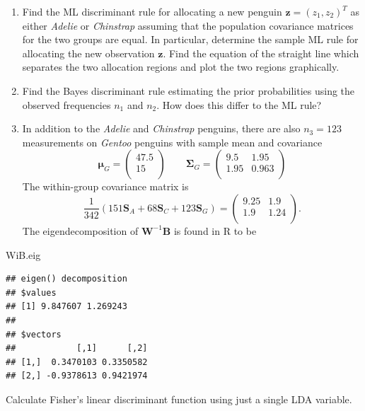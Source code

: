 \documentclass[
]{book}
\newenvironment{Shaded}{\begin{snugshade}}{\end{snugshade}}
\newcommand{\NormalTok}[1]{#1}
\theoremstyle{definition}
\theoremstyle{definition}
\theoremstyle{definition}
\theoremstyle{definition}
\theoremstyle{remark}
\begin{document}
\begin{enumerate}
\def\labelenumi{\roman{enumi}.}
\item
  Find the ML discriminant rule for allocating a new penguin \(\mathbf z=(z_1,z_2)^T\) as either \emph{Adelie} or \emph{Chinstrap} assuming that the population covariance matrices for the two groups are equal. In particular, determine the sample ML rule for allocating the new observation \(\mathbf z\). Find the equation of the straight line which separates the two allocation regions and plot the two regions graphically.
\item
  Find the Bayes discriminant rule estimating the prior probabilities using the observed frequencies \(n_1\) and \(n_2\). How does this differ to the ML rule?
\item
  In addition to the \emph{Adelie} and \emph{Chinstrap} penguins, there are also \(n_3=123\) measurements on \emph{Gentoo} penguins with sample mean and covariance
  \[
  {\boldsymbol{\mu}}_{G}=\begin{pmatrix}47.5 \\15 \\\end{pmatrix} \qquad \boldsymbol{\Sigma}_G = \begin{pmatrix}9.5&1.95 \\1.95&0.963 \\\end{pmatrix}\]
  The within-group covariance matrix is
  \[ \frac{1}{342}(151 \mathbf S_A + 68 \mathbf S_C + 123 \mathbf S_G) = \begin{pmatrix}9.25&1.9 \\1.9&1.24 \\\end{pmatrix}.\]
  The eigendecomposition of \(\mathbf W^{-1}\mathbf B\) is found in R to be
\end{enumerate}

\begin{Shaded}
\begin{Highlighting}[]
\NormalTok{WiB.eig}
\end{Highlighting}
\end{Shaded}

\begin{verbatim}
## eigen() decomposition
## $values
## [1] 9.847607 1.269243
## 
## $vectors
##            [,1]      [,2]
## [1,]  0.3470103 0.3350582
## [2,] -0.9378613 0.9421974
\end{verbatim}

Calculate Fisher's linear discriminant function using just a single LDA variable.
\end{document}
